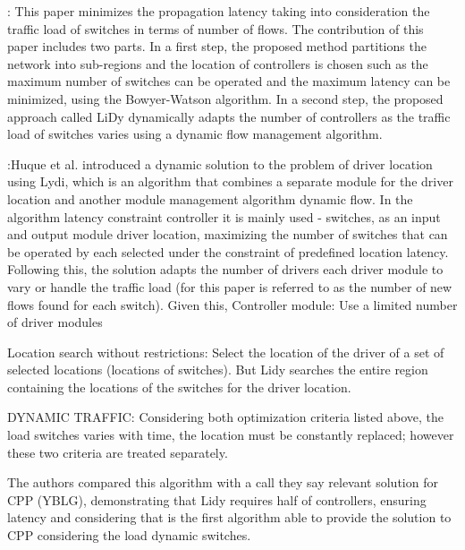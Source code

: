 \documentclass[a4paper,10pt]{article}
\begin{document}
 \cite{HuJo15}: This paper minimizes the propagation latency taking into consideration the traffic load of switches in terms of number of flows.  The contribution of this paper includes two parts. In a first step, the proposed method partitions the network into sub-regions and the location of controllers is chosen such as the maximum number of switches can be operated and the maximum latency can be minimized,  using the Bowyer-Watson algorithm. In a second step, the proposed approach called LiDy dynamically adapts the number of controllers as the traffic load of switches varies using a dynamic flow management algorithm.
 
 \cite{HuJo15}:Huque et al. introduced a dynamic solution to the problem of driver location using Lydi, which is an algorithm that combines a separate module for the driver location and another module management algorithm dynamic flow. In the algorithm latency constraint controller it is mainly used - switches, as an input and output module driver location, maximizing the number of switches that can be operated by each selected under the constraint of predefined location latency. Following this, the solution adapts the number of drivers each driver module to vary or handle the traffic load (for this paper is referred to as the number of new flows found for each switch). Given this,
Controller module: Use a limited number of driver modules

Location search without restrictions: Select the location of the driver of a set of selected locations (locations of switches). But Lidy searches the entire region containing the locations of the switches for the driver location.

DYNAMIC TRAFFIC: Considering both optimization criteria listed above, the load switches varies with time, the location must be constantly replaced; however these two criteria are treated separately.

The authors compared this algorithm with a call they say relevant solution for CPP (YBLG), demonstrating that Lidy requires half of controllers, ensuring latency and considering that is the first algorithm able to provide the solution to CPP considering the load dynamic switches. 

\end{document}
